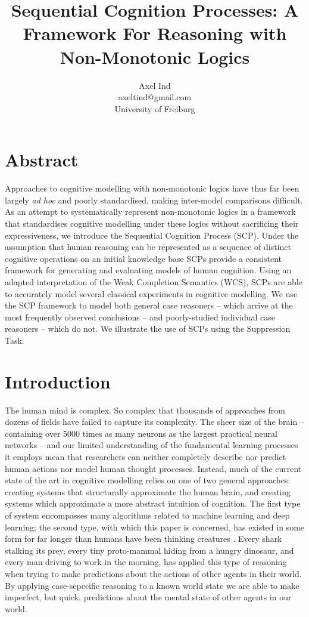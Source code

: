 \documentclass{article}
\begin{document}
\title{Sequential Cognition Processes: A Framework For Reasoning with Non-Monotonic Logics}
\author{Axel Ind \\ axeltind@gmail.com \\ University of Freiburg}

\maketitle

\section*{Abstract}
Approaches to cognitive modelling with non-monotonic logics have thus far been largely \textit{ad hoc} and poorly standardised, making inter-model comparisons difficult. As an attempt to systematically represent non-monotonic logics in a framework that standardises cognitive modelling under these logics without sacrificing their expressiveness, we introduce the Sequential Cognition Process (SCP). Under the assumption that human reasoning can be represented as a sequence of distinct cognitive operations on an initial knowledge base SCPs provide a consistent framework for generating and evaluating models of human cognition. Using an adapted interpretation of the Weak Completion Semantics (WCS), SCPs are able to accurately model several classical experiments in cognitive modelling. We use the SCP framework to model both general case reasoners -- which arrive at the most frequently observed conclusions -- and poorly-studied individual case reasoners -- which do not. We illustrate the use of SCPs using the Suppression Task.

\section{Introduction}
The human mind is complex. So complex that thousands of approaches from dozens of fields have failed to capture its complexity. The sheer size of the brain -- containing  over 5000 times as many neurons as the largest practical neural networks \citep{mocanu2018scalable} -- and our limited understanding of the fundamental learning processes it employs mean that researchers can neither completely describe nor predict human actions nor model human thought processes. Instead, much of the current state of the art in cognitive modelling relies on one of two general approaches: creating systems that structurally approximate the human brain, and creating systems which approximate a more abstract intuition of cognition. The first type of system encompasses many algorithms related to machine learning and deep learning; the second type, with which this paper is concerned, has existed in some form for far longer than humans have been thinking creatures \citep{smirnova2015crows}. Every shark stalking its prey, every tiny proto-mammal hiding from a hungry dinosaur, and every man driving to work in the morning, has applied this type of reasoning when trying to make predictions about the actions of other agents in their world. By applying case-sepecific reasoning to a known world state we are able to make imperfect, but quick, predictions about the mental state of other agents in our world.
\end{document}
